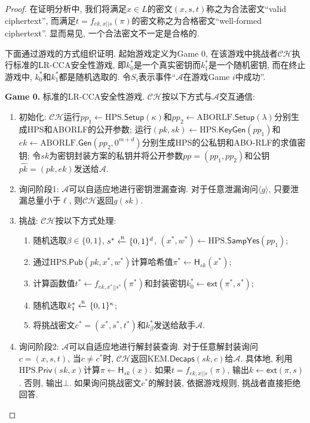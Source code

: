 \begin{proof}
在证明分析中, 我们将满足$x \in L$的密文$(x,s,t)$称之为合法密文``valid ciphertext'', 而满足$t = f_{ek,x||s}(\pi)$的密文称之为合格密文``well-formed ciphertext''.  显而易见, 一个合法密文不一定是合格的.  

下面通过游戏的方式组织证明. 起始游戏定义为Game 0, 在该游戏中挑战者$\mathcal{CH}$执行标准的LR-CCA安全性游戏, 即$k_0^*$是一个真实密钥而$k_1^*$是一个随机密钥, 而在终止游戏中, $k_0^*$和$k_1^*$都是随机选取的. 令$S_i$表示事件``$\mathcal{A}$在游戏Game $i$中成功''.  

\begin{trivlist}
\item \textbf{Game 0.} 标准的LR-CCA安全性游戏. $\mathcal{CH}$按以下方式与$\mathcal{A}$交互通信:
\begin{enumerate} \itemsep 1pt \parskip 0pt \parsep 0pt
\item 初始化: $\mathcal{CH}$运行$pp_1 \leftarrow \text{HPS}.\mathsf{Setup}(\kappa)$和$pp_2 \leftarrow \text{ABORLF}.\mathsf{Setup}(\lambda)$分别生成HPS和ABORLF的公开参数; 运行$(pk, sk) \leftarrow \text{HPS}.\mathsf{KeyGen}(pp_1)$和$ek \leftarrow \text{ABORLF}.\mathsf{Gen}(pp_2, 0^{m+d})$分别生成HPS的公私钥和ABO-RLF的求值密钥; 令$sk$为密钥封装方案的私钥并将公开参数$pp = (pp_1, pp_2)$和公钥$\hat{pk} = (pk, ek)$发送给$\mathcal{A}$.

\item 询问阶段1: $\mathcal{A}$可以自适应地进行密钥泄漏查询. 
    对于任意泄漏询问$\langle g \rangle$, 只要泄漏总量小于$\ell$, 则$\mathcal{CH}$返回$g(sk)$.

\item 挑战: $\mathcal{CH}$按以下方式处理:
\begin{enumerate}
\item 随机选取$\beta \in \{0,1\}$, $s^* \xleftarrow{\textup{\tiny R}} \{0,1\}^d$, 
    $(x^*, w^*) \leftarrow \text{HPS}.\mathsf{SampYes}(pp_1)$; 
\item 通过$\text{HPS}.\mathsf{Pub}(pk, x^*, w^*)$计算哈希值$\pi^* \leftarrow \mathsf{H}_{sk}(x^*)$;

\item 计算函数值$t^* \leftarrow f_{ek,x^*||s^*}(\pi^*)$和封装密钥$k_0^* \leftarrow \mathsf{ext}(\pi^*, s^*)$; 

\item 随机选取$k_1^* \xleftarrow{\textup{\tiny R}} \{0,1\}^\kappa$; 

\item 将挑战密文$c^* = (x^*, s^*, t^*)$和$k_\beta^*$发送给敌手$\mathcal{A}$.
\end{enumerate}
\item 询问阶段2: $\mathcal{A}$可以自适应地进行解封装查询. 对于任意解封装询问$c = (x,s,t)$, 当$c \neq c^*$时, $\mathcal{CH}$返回$\text{KEM}.\mathsf{Decaps}(sk,c)$给$\mathcal{A}$. 具体地, 
利用$\text{HPS}.\mathsf{Priv}(sk, x)$计算$\pi \leftarrow \mathsf{H}_{sk}(x)$. 如果$t = f_{ek,x||s}(\pi)$, 输出$k \leftarrow \mathsf{ext}(\pi, s)$. 否则, 输出$\bot$. 如果询问挑战密文$c^*$的解封装, 依据游戏规则, 挑战者直接拒绝回答.


\end{enumerate}
\end{trivlist}
\end{proof}
